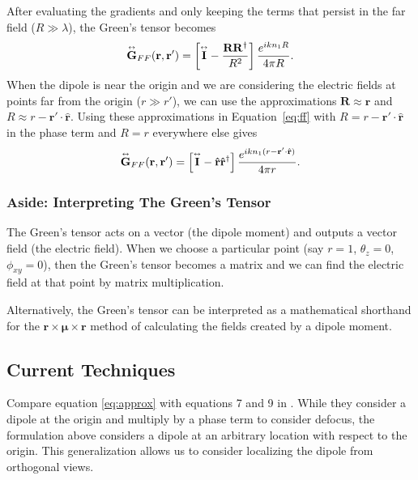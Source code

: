 \documentclass[11pt]{article}
\providecommand{\mb}[1]{\mathbf{#1}}
\providecommand{\bs}[1]{\boldsymbol{#1}}
\newcommand{\tensor}[1]{\overset{\text{\tiny$\leftrightarrow$}}{\mb{#1}}}
\begin{document}
After evaluating the gradients and only keeping the terms that persist in the
far field ($R\gg\lambda$), the Green's tensor becomes
 \begin{align}
   \tensor{\mb{G}}_{FF}(\mb{r}, \mb{r'}) = \left[\tensor{\mb{I}} - \frac{\mb{R}\mb{R}^{\dag}}{R^2}\right]\frac{e^{ikn_1R}}{4\pi R}. \label{eq:ff}
 \end{align}
 When the dipole is near the origin and we are considering the electric fields
 at points far from the origin ($r\gg r'$), we can use the approximations
 $\mb{R} \approx \mb{r}$ and $R \approx r - \mb{r'}\cdot\hat{\mb{r}}$. Using
 these approximations in Equation~\ref{eq:ff} with
 $R = r - \mb{r'}\cdot\hat{\mb{r}}$ in the phase term and $R = r$ everywhere
 else gives
 \begin{align}
   \tensor{\mb{G}}_{FF}(\mb{r}, \mb{r'}) = \left[\tensor{\mb{I}} - \mb{\hat{r}}\mb{\hat{r}}^{\dag}\right]\frac{e^{ikn_1(r - \mb{r'}\cdot\hat{\mb{r}})}}{4\pi r}. \label{eq:approx}
 \end{align}

\subsubsection{Aside: Interpreting The Green's Tensor}
The Green's tensor acts on a vector (the dipole moment) and outputs a
vector field (the electric field). When we choose a particular point (say $r=1$,
$\theta_z=0$, $\phi_{xy}=0$), then the Green's tensor becomes a matrix and we
can find the electric field at that point by matrix multiplication.

Alternatively, the Green's tensor can be interpreted as a mathematical shorthand
for the $\mb{r}\times\bs{\mu}\times\mb{r}$ method \cite{fourkas} of calculating
the fields created by a dipole moment.

\subsection{Current Techniques}
 Compare equation \ref{eq:approx} with equations 7 and 9 in \cite{backer}. While they
 consider a dipole at the origin and multiply by a phase term to consider
 defocus, the formulation above considers a dipole at an arbitrary location with
 respect to the origin. This generalization allows us to consider localizing the
 dipole from orthogonal views.
\end{document}
